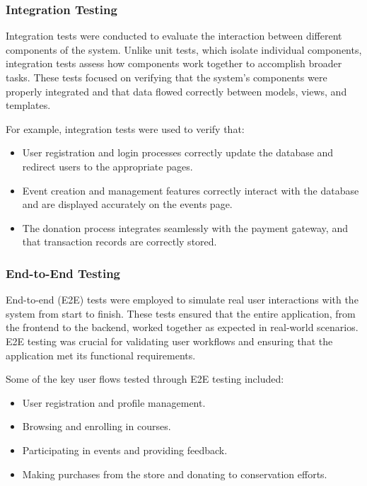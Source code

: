 \subsubsection{Integration Testing}

Integration tests were conducted to evaluate the interaction between different components of the system. Unlike unit tests, which isolate individual components, integration tests assess how components work together to accomplish broader tasks. These tests focused on verifying that the system's components were properly integrated and that data flowed correctly between models, views, and templates.

For example, integration tests were used to verify that:

\begin{itemize}
    \item User registration and login processes correctly update the database and redirect users to the appropriate pages.
    \item Event creation and management features correctly interact with the database and are displayed accurately on the events page.
    \item The donation process integrates seamlessly with the payment gateway, and that transaction records are correctly stored.
\end{itemize}

\subsubsection{End-to-End Testing}

End-to-end (E2E) tests were employed to simulate real user interactions with the system from start to finish. These tests ensured that the entire application, from the frontend to the backend, worked together as expected in real-world scenarios. E2E testing was crucial for validating user workflows and ensuring that the application met its functional requirements.

Some of the key user flows tested through E2E testing included:

\begin{itemize}
    \item User registration and profile management.
    \item Browsing and enrolling in courses.
    \item Participating in events and providing feedback.
    \item Making purchases from the store and donating to conservation efforts.
\end{itemize}

